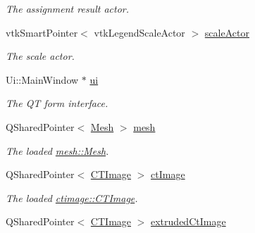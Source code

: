 \begin{DoxyCompactItemize}
\begin{DoxyCompactList}\small\item\em The assignment result actor. \item\end{DoxyCompactList}\item 
\hypertarget{classgui_1_1_main_window_a6dcbdf1bcf22df87077fa31aedc2da15}{
vtkSmartPointer$<$ vtkLegendScaleActor $>$ \hyperlink{classgui_1_1_main_window_a6dcbdf1bcf22df87077fa31aedc2da15}{scaleActor}}
\label{classgui_1_1_main_window_a6dcbdf1bcf22df87077fa31aedc2da15}

\begin{DoxyCompactList}\small\item\em The scale actor. \item\end{DoxyCompactList}\item 
\hypertarget{classgui_1_1_main_window_a8682deb203079f8f3f5d5df705e60703}{
Ui::MainWindow $\ast$ \hyperlink{classgui_1_1_main_window_a8682deb203079f8f3f5d5df705e60703}{ui}}
\label{classgui_1_1_main_window_a8682deb203079f8f3f5d5df705e60703}

\begin{DoxyCompactList}\small\item\em The QT form interface. \item\end{DoxyCompactList}\item 
\hypertarget{classgui_1_1_main_window_a3c687d09e6ac3432b3660bf6c0c1783f}{
QSharedPointer$<$ \hyperlink{classmesh_1_1_mesh}{Mesh} $>$ \hyperlink{classgui_1_1_main_window_a3c687d09e6ac3432b3660bf6c0c1783f}{mesh}}
\label{classgui_1_1_main_window_a3c687d09e6ac3432b3660bf6c0c1783f}

\begin{DoxyCompactList}\small\item\em The loaded \hyperlink{classmesh_1_1_mesh}{mesh::Mesh}. \item\end{DoxyCompactList}\item 
\hypertarget{classgui_1_1_main_window_ad25359ec4b7f6d23d292c3cf5d3e3e36}{
QSharedPointer$<$ \hyperlink{classctimage_1_1_c_t_image}{CTImage} $>$ \hyperlink{classgui_1_1_main_window_ad25359ec4b7f6d23d292c3cf5d3e3e36}{ctImage}}
\label{classgui_1_1_main_window_ad25359ec4b7f6d23d292c3cf5d3e3e36}

\begin{DoxyCompactList}\small\item\em The loaded \hyperlink{classctimage_1_1_c_t_image}{ctimage::CTImage}. \item\end{DoxyCompactList}\item 
\hypertarget{classgui_1_1_main_window_a301d15abf322ace147c5d6f20093830c}{
QSharedPointer$<$ \hyperlink{classctimage_1_1_c_t_image}{CTImage} $>$ \hyperlink{classgui_1_1_main_window_a301d15abf322ace147c5d6f20093830c}{extrudedCtImage}}
\label{classgui_1_1_main_window_a301d15abf322ace147c5d6f20093830c}


\end{DoxyCompactItemize}
